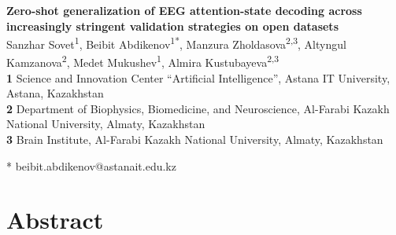 \documentclass[10pt,letterpaper]{article}
\begin{document}
\vspace*{0.2in}

\begin{flushleft}
{\Large
\textbf{Zero-shot generalization of EEG attention-state decoding across increasingly stringent validation strategies on open datasets} %
}
\newline
\\
Sanzhar Sovet\textsuperscript{1},
Beibit Abdikenov\textsuperscript{1*},
Manzura Zholdasova\textsuperscript{2,3},
Altyngul Kamzanova\textsuperscript{2},
Medet Mukushev\textsuperscript{1},
Almira Kustubayeva\textsuperscript{2,3}
\\
\bigskip
\textbf{1} Science and Innovation Center ``Artificial Intelligence'', Astana IT University, Astana, Kazakhstan
\\
\textbf{2} Department of Biophysics, Biomedicine, and Neuroscience, Al-Farabi Kazakh National University, Almaty, Kazakhstan
\\
\textbf{3} Brain Institute, Al-Farabi Kazakh National University, Almaty, Kazakhstan
\\
\bigskip

* beibit.abdikenov@astanait.edu.kz

\end{flushleft}

\section*{Abstract}
\end{document}
